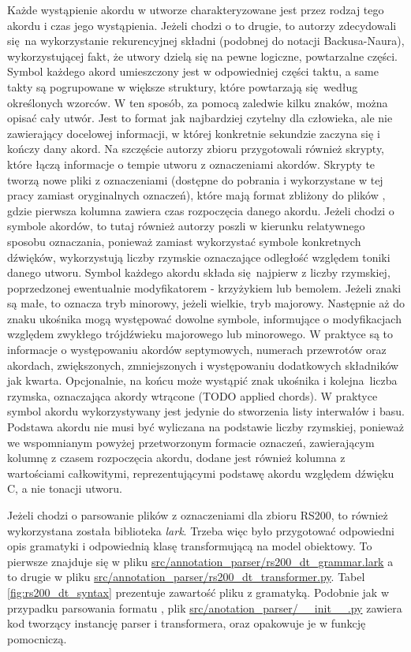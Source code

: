 Każde wystąpienie akordu w utworze charakteryzowane jest przez rodzaj tego akordu i czas jego wystąpienia. Jeżeli chodzi o to drugie, to autorzy zdecydowali się na wykorzystanie rekurencyjnej składni (podobnej do notacji Backusa-Naura), wykorzystującej fakt, że utwory dzielą się na pewne logiczne, powtarzalne części. Symbol każdego akord umieszczony jest w odpowiedniej części taktu, a same takty są pogrupowane w większe struktury, które powtarzają się według określonych wzorców. W ten sposób, za pomocą zaledwie kilku znaków, można opisać cały utwór. Jest to format jak najbardziej czytelny dla człowieka, ale nie zawierający docelowej informacji, w której konkretnie sekundzie zaczyna się i kończy dany akord. Na szczęście autorzy zbioru przygotowali również skrypty, które łączą informacje o tempie utworu z oznaczeniami akordów. Skrypty te tworzą nowe pliki z oznaczeniami (dostępne do pobrania i wykorzystane w tej pracy zamiast oryginalnych oznaczeń), które mają format zbliżony do plików , gdzie pierwsza kolumna zawiera czas rozpoczęcia danego akordu. Jeżeli chodzi o symbole akordów, to tutaj również autorzy poszli w kierunku relatywnego sposobu oznaczania, ponieważ zamiast wykorzystać symbole konkretnych dźwięków, wykorzystują liczby rzymskie oznaczające odległość względem toniki danego utworu.  Symbol każdego akordu składa się najpierw z liczby rzymskiej, poprzedzonej ewentualnie modyfikatorem - krzyżykiem lub bemolem. Jeżeli znaki są małe, to oznacza tryb minorowy, jeżeli wielkie, tryb majorowy. Następnie aż do znaku ukośnika mogą występować dowolne symbole, informujące o modyfikacjach względem zwykłego trójdźwieku majorowego lub minorowego. W praktyce są to informacje o występowaniu akordów septymowych, numerach przewrotów oraz akordach, zwiększonych, zmniejszonych i występowaniu dodatkowych składników jak kwarta. Opcjonalnie, na końcu może wystąpić znak ukośnika i kolejna liczba rzymska, oznaczająca akordy wtrącone (TODO applied chords). W praktyce symbol akordu wykorzystywany jest jedynie do stworzenia listy interwałów i basu.  Podstawa akordu nie musi być wyliczana na podstawie liczby rzymskiej, ponieważ we wspomnianym powyżej przetworzonym formacie oznaczeń, zawierającym kolumnę z czasem rozpoczęcia akordu, dodane jest również kolumna z wartościami całkowitymi, reprezentującymi podstawę akordu względem dźwięku C, a nie tonacji utworu.

Jeżeli chodzi o parsowanie plików z oznaczeniami dla zbioru RS200, to również wykorzystana została biblioteka \emph{lark}. Trzeba więc było przygotować odpowiedni opis gramatyki i odpowiednią klasę transformującą na model obiektowy. To pierwsze znajduje się w pliku \url{src/annotation_parser/rs200_dt_grammar.lark} a to drugie w pliku \url{src/annotation_parser/rs200_dt_transformer.py}. Tabel \ref{fig:rs200_dt_syntax} prezentuje zawartość pliku z gramatyką. Podobnie jak w przypadku parsowania formatu , plik \url{src/anotation_parser/__init__.py} zawiera kod tworzący instancję parser i transformera, oraz opakowuje je w funkcję pomocniczą.


